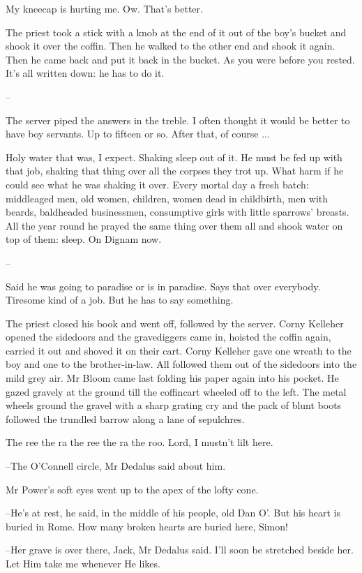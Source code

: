 My kneecap is hurting me.
Ow.
That's better.

The priest took a stick with a knob at the end of it
out of the boy's bucket and shook it over the coffin.
Then he walked to the other end and shook it again.
Then he came back and put it back in the bucket.
As you were before you rested.
It's all written down:
he has to do it.

--

The server piped the answers in the treble.
I often thought it would be better to have boy servants.
Up to fifteen or so.
After that, of course ...

Holy water that was, I expect.
Shaking sleep out of it.
He must be fed up with that job,
shaking that thing over all the corpses they trot up.
What harm if he could see what he was shaking it over.
Every mortal day a fresh batch:
middleaged men, old women, children,
women dead in childbirth,
men with beards, baldheaded businessmen,
consumptive girls with little sparrows' breasts.
All the year round
he prayed the same thing over them all and shook water on top of them:
sleep.
On Dignam now.

--

Said he was going to paradise or is in paradise.
Says that over everybody.
Tiresome kind of a job.
But he has to say something.

The priest closed his book and went off, followed by the server.
Corny Kelleher opened the sidedoors and the gravediggers came in,
hoisted the coffin again, carried it out and shoved it on their cart.
Corny Kelleher gave one wreath to the boy and one to the brother-in-law.
All followed them out of the sidedoors into the mild grey air.
Mr Bloom came last
folding his paper again into his pocket.
He gazed gravely at the ground
till the coffincart wheeled off to the left.
The metal wheels ground the gravel
with a sharp grating cry
and the pack of blunt boots followed the trundled barrow
along a lane of sepulchres.

The ree the ra the ree the ra the roo.
Lord, I mustn't lilt here.

--The O'Connell circle,
Mr Dedalus said about him.

Mr Power's soft eyes went up to the apex of the lofty cone.

--He's at rest,
he said,
in the middle of his people, old Dan O'.
But his heart is buried in Rome.
How many broken hearts are buried here, Simon!

--Her grave is over there, Jack,
Mr Dedalus said.
I'll soon be stretched beside her.
Let Him take me whenever He likes.

